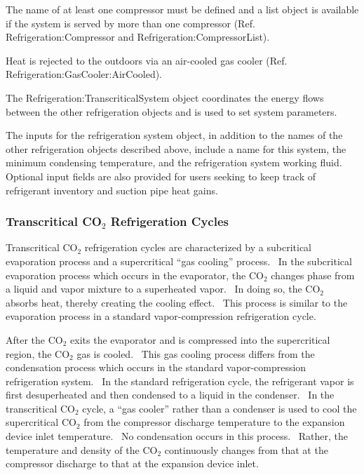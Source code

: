 The name of at least one compressor must be defined and a list object is available if the system is served by more than one compressor (Ref. Refrigeration:Compressor and Refrigeration:CompressorList).

Heat is rejected to the outdoors via an air-cooled gas cooler (Ref. Refrigeration:GasCooler:AirCooled).

The Refrigeration:TranscriticalSystem object coordinates the energy flows between the other refrigeration objects and is used to set system parameters.

The inputs for the refrigeration system object, in addition to the names of the other refrigeration objects described above, include a name for this system, the minimum condensing temperature, and the refrigeration system working fluid.~ Optional input fields are also provided for users seeking to keep track of refrigerant inventory and suction pipe heat gains.

\subsubsection{\texorpdfstring{Transcritical CO\(_{2}\) Refrigeration Cycles}{Transcritical CO\_\{2\} Refrigeration Cycles}}\label{transcritical-coux5f2-refrigeration-cycles}

Transcritical CO\(_{2}\) refrigeration cycles are characterized by a subcritical evaporation process and a supercritical ``gas cooling'' process.~ In the subcritical evaporation process which occurs in the evaporator, the CO\(_{2}\) changes phase from a liquid and vapor mixture to a superheated vapor.~ In doing so, the CO\(_{2}\) absorbs heat, thereby creating the cooling effect.~ This process is similar to the evaporation process in a standard vapor-compression refrigeration cycle.

After the CO\(_{2}\) exits the evaporator and is compressed into the supercritical region, the CO\(_{2}\) gas is cooled.~ This gas cooling process differs from the condensation process which occurs in the standard vapor-compression refrigeration system.~ In the standard refrigeration cycle, the refrigerant vapor is first desuperheated and then condensed to a liquid in the condenser.~ In the transcritical CO\(_{2}\) cycle, a ``gas cooler'' rather than a condenser is used to cool the supercritical CO\(_{2}\) from the compressor discharge temperature to the expansion device inlet temperature.~ No condensation occurs in this process.~ Rather, the temperature and density of the CO\(_{2}\) continuously changes from that at the compressor discharge to that at the expansion device inlet.

